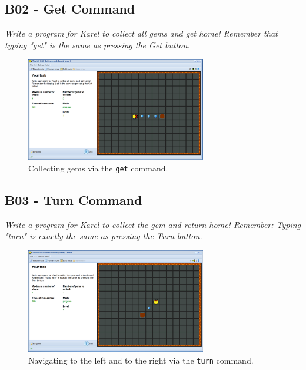 \documentclass[article,A4,12pt]{llncs}
\begin{document}
\newpage
\subsection{B02 - Get Command}

{\em Write a program for Karel to collect all gems and get home! 
Remember that typing "get" is the same as pressing the Get button.}\\[-7mm]

\begin{figure}[!ht]
\begin{center}
\includegraphics[width=0.7\textwidth]{img/b02.png}
\end{center}
\vspace{-4mm}
\caption{Collecting gems via the {\tt get} command.}
\label{fig:b02}
\vspace{-4mm}
\end{figure}
\noindent

\subsection{B03 - Turn Command}

{\em Write a program for Karel to collect the gem and return 
home! Remember: Typing "turn" is exactly the same as pressing 
the Turn button.}\\[-7mm]

\begin{figure}[!ht]
\begin{center}
\includegraphics[width=0.7\textwidth]{img/b03.png}
\end{center}
\vspace{-4mm}
\caption{Navigating to the left and to the right via the {\tt turn} command.}
\label{fig:b03}
\vspace{-4mm}
\end{figure}
\noindent
\newpage
\end{document}
